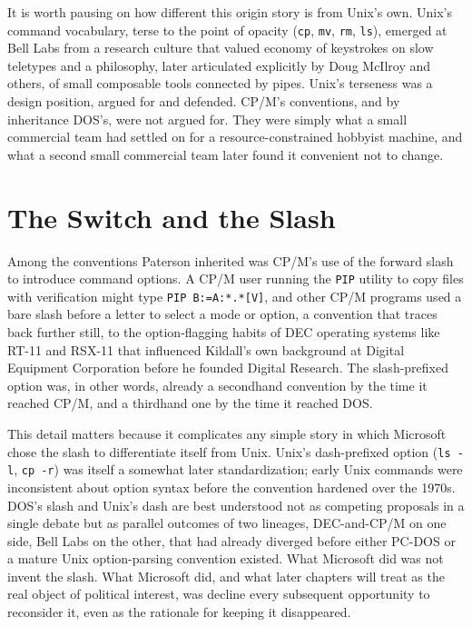\documentclass[11pt]{book}
\begin{document}
It is worth pausing on how different this origin story is from Unix's own. Unix's command vocabulary, terse to the point of opacity (\texttt{cp}, \texttt{mv}, \texttt{rm}, \texttt{ls}), emerged at Bell Labs from a research culture that valued economy of keystrokes on slow teletypes and a philosophy, later articulated explicitly by Doug McIlroy and others, of small composable tools connected by pipes. Unix's terseness was a design position, argued for and defended. CP/M's conventions, and by inheritance DOS's, were not argued for. They were simply what a small commercial team had settled on for a resource-constrained hobbyist machine, and what a second small commercial team later found it convenient not to change.

\section{The Switch and the Slash}

Among the conventions Paterson inherited was CP/M's use of the forward slash to introduce command options. A CP/M user running the \texttt{PIP} utility to copy files with verification might type \texttt{PIP B:=A:*.*[V]}, and other CP/M programs used a bare slash before a letter to select a mode or option, a convention that traces back further still, to the option-flagging habits of DEC operating systems like RT-11 and RSX-11 that influenced Kildall's own background at Digital Equipment Corporation before he founded Digital Research. The slash-prefixed option was, in other words, already a secondhand convention by the time it reached CP/M, and a thirdhand one by the time it reached DOS.

This detail matters because it complicates any simple story in which Microsoft chose the slash to differentiate itself from Unix. Unix's dash-prefixed option (\texttt{ls -l}, \texttt{cp -r}) was itself a somewhat later standardization; early Unix commands were inconsistent about option syntax before the convention hardened over the 1970s. DOS's slash and Unix's dash are best understood not as competing proposals in a single debate but as parallel outcomes of two lineages, DEC-and-CP/M on one side, Bell Labs on the other, that had already diverged before either PC-DOS or a mature Unix option-parsing convention existed. What Microsoft did was not invent the slash. What Microsoft did, and what later chapters will treat as the real object of political interest, was decline every subsequent opportunity to reconsider it, even as the rationale for keeping it disappeared.
\end{document}
